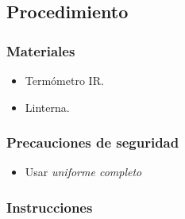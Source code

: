 \subsection{Procedimiento}

\subsubsection{Materiales}
\begin{itemize}
	\item Termómetro IR.
	\item Linterna.
\end{itemize}

\subsubsection{Precauciones de seguridad}

\begin{itemize}
	\item Usar \emph{uniforme completo} %
\end{itemize}

\subsubsection{Instrucciones}

